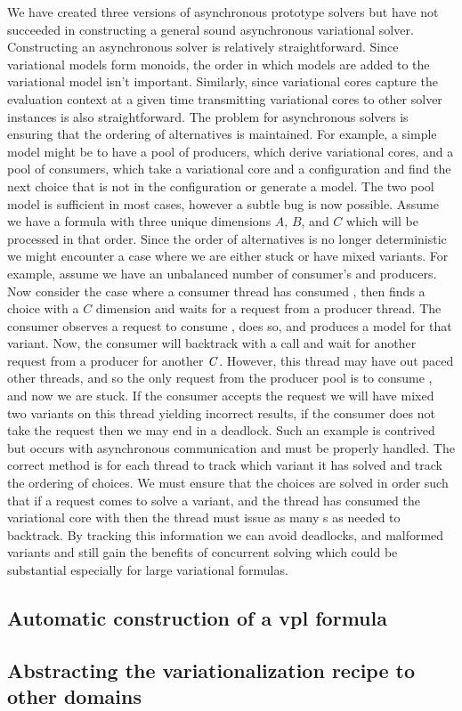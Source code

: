 We have created three versions of asynchronous prototype solvers but have not
succeeded in constructing a general sound asynchronous variational solver.
Constructing an asynchronous solver is relatively straightforward. Since
variational models form monoids, the order in which models are added to the
variational model isn't important. Similarly, since variational cores capture
the evaluation context at a given time transmitting variational cores to other
solver instances is also straightforward. The problem for asynchronous solvers
is ensuring that the ordering of alternatives is maintained. For example, a
simple model might be to have a pool of producers, which derive variational
cores, and a pool of consumers, which take a variational core and a
configuration and find the next choice that is not in the configuration or
generate a model. The two pool model is sufficient in most cases, however a
subtle bug is now possible. Assume we have a formula with three unique
dimensions $A$, $B$, and $C$ which will be processed in that order. Since the
order of alternatives is no longer deterministic we might encounter a case where
we are either stuck or have mixed variants. For example, assume we have an
unbalanced number of consumer's and producers. Now consider the case where a
consumer thread has consumed , then finds a choice
with a $C$ dimension and waits for a request from a producer thread. The
consumer observes a request to consume , does so, and produces a
model for that variant. Now, the consumer will backtrack with a  call
and wait for another request from a producer for another $\mathit{C}$. However, this
thread may have out paced other threads, and so the only request from the
producer pool is to consume , and now we are stuck. If the
consumer accepts the request we will have mixed two variants on this thread
yielding incorrect results, if the consumer does not take the request then we
may end in a deadlock. Such an example is contrived but occurs with asynchronous
communication and must be properly handled. The correct method is for each
thread to track which variant it has solved and track the ordering of choices.
We must ensure that the choices are solved in order such that if a request comes
to solve a  variant, and the thread has consumed the
variational core with  then the thread must issue as many
s as needed to backtrack. By tracking this information we can avoid
deadlocks, and malformed variants and still gain the benefits of concurrent
solving which could be substantial especially for large variational formulas.



\subsection{Automatic construction of a \ac{vpl} formula}

\subsection{Abstracting the variationalization recipe to other domains}


